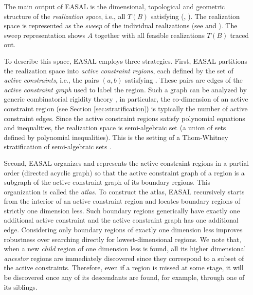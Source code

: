 The main output of EASAL is the dimensional, topological and geometric
structure of the \emph{realization space}, i.e., all $T(B)$ satisfying (\cone,
\ctwo). The realization space is represented as the \emph{sweep} of the
individual realizations (see  and
). The sweep representation shows $A$ together with all
feasible realizations $T(B)$ traced out.


To describe this space, EASAL employs three strategies.  First, EASAL
partitions the realization space into \emph{active constraint regions}, each
defined by the set of \emph{active constraints}, i.e., the pairs $(a,b)$
satisfying \ctwo.  These pairs are edges of the \emph{active constraint graph}
used to label the region.  Such a graph can be analyzed by generic
combinatorial rigidity theory \cite{CombinatorialRigidity}, in particular, the
co-dimension of an active constraint region (see Section
\ref{sec:stratification}) is typically the number of active constraint edges.
Since the active constraint regions satisfy polynomial equations and
inequalities, the realization space is semi-algebraic set (a union of sets
defined by polynomial inequalities).  This is the setting of a Thom-Whitney
stratification of semi-algebraic sets \cite{Kuo}.

Second, EASAL organizes and represents the active constraint regions in a
partial order (directed acyclic graph) so that the active constraint graph of a
region is a subgraph of the active constraint graph of its boundary regions.
This organization is called the \emph{atlas}. To construct the atlas, EASAL
recursively starts from the interior of an active constraint region and locates
boundary regions of strictly one dimension less. Such boundary regions
generically have exactly one additional active constraint and the active
constraint graph has one additional edge. Considering only boundary regions of
exactly one dimension less improves robustness over searching directly for
lowest-dimensional regions. We note that, when a new \emph{child} region of one
dimension less is found, all its higher dimensional \emph{ancestor} regions are
immediately discovered since they correspond to a subset of the active
constraints.  Therefore, even if a region is missed at some stage, it will be
discovered once any of its descendants are found, for example, through one of its siblings.

